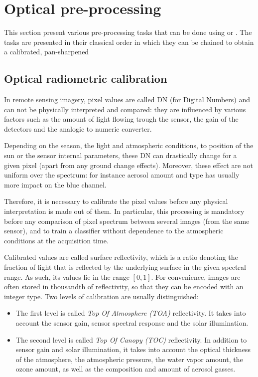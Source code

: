 \section{Optical pre-processing}\label{sec:optpreproc}

This section present various pre-processing tasks that can be done
using \app or \mont. The tasks are presented in their classical order
in which they can be chained to obtain a calibrated, pan-sharpened 

\subsection{Optical radiometric calibration}\label{ssec:optcal}

In remote sensing imagery, pixel values are called DN (for Digital
Numbers) and can not be physically interpreted and compared: they are
influenced by various factors such as the amount of light flowing
trough the sensor, the gain of the detectors and the analogic to
numeric converter.

Depending on the season, the light and atmospheric conditions, to
position of the sun or the sensor internal parameters, these DN can
drastically change for a given pixel (apart from any ground change
effects). Moreover, these effect are not uniform over the spectrum:
for instance aerosol amount and type has usually more impact on the
blue channel.

Therefore, it is necessary to calibrate the pixel values before any
physical interpretation is made out of them. In particular, this
processing is mandatory before any comparison of pixel spectrum
between several images (from the same sensor), and to train a
classifier without dependence to the atmospheric conditions at the
acquisition time.

Calibrated values are called surface reflectivity, which is a ratio
denoting the fraction of light that is reflected by the underlying
surface in the given spectral range. As such, its values lie in the
range $[0,1]$. For convenience, images are often stored in thousandth
of reflectivity, so that they can be encoded with an integer type.
Two levels of calibration are usually distinguished:

\begin{itemize}
\item The first level is called \emph{Top Of Atmosphere (TOA)}
  reflectivity. It takes into account the sensor gain, sensor spectral
  response and the solar illumination.
\item The second level is called \emph{Top Of Canopy (TOC)}
  reflectivity. In addition to sensor gain and solar illumination, it
  takes into account the optical thickness of the atmosphere, the
  atmospheric pressure, the water vapor amount, the ozone amount, as
  well as the composition and amount of aerosol gasses.
\end{itemize}

